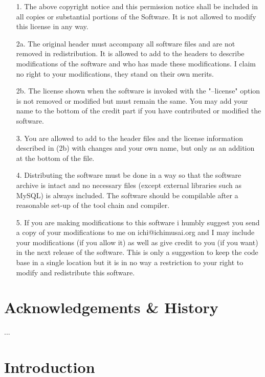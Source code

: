 \documentclass[english,twoside,openright,a4paper,12pt]{report}
\begin{document}
\begin{itemize}
\item[1.] The above copyright notice and this permission notice shall be included in all copies or substantial portions of the Software. It is not allowed to modify this license in any way. 

\item[2a.] The original header must accompany all software files and are not 
   removed in redistribution. It is allowed to add to the headers to 
   describe modifications of the software and who has made these 
   modifications. I claim no right to your modifications, they stand 
   on their own merits. 
 
\item[2b.] The license shown when the software is invoked with the "--license" 
   option is not removed or modified but must remain the same. You may 
   add your name to the bottom of the credit part if you have 
   contributed or modified the software. 
 
\item[3.] You are allowed to add to the header files and the license 
   information described in (2b) with changes and your own name, but 
   only as an addition at the bottom of the file. 
 
\item[4.] Distributing the software must be done in a way so that the 
   software archive is intact and no necessary files (except external 
   libraries such as MySQL) is always included. The software should be 
   compilable after a reasonable set-up of the tool chain and 
   compiler. 
 
\item[5.] If you are making modifications to this software i humbly suggest 
   you send a copy of your modifications to me on ichi@ichimusai.org 
   and I may include your modifications (if you allow it) as well as 
   give credit to you (if you want) in the next release of the 
   software. This is only a suggestion to keep the code base in a 
   single location but it is in no way a restriction to your right to 
   modify and redistribute this software. 
\end{itemize}


\chapter{Acknowledgements \& History}
...


\chapter{Introduction}
\end{document}

